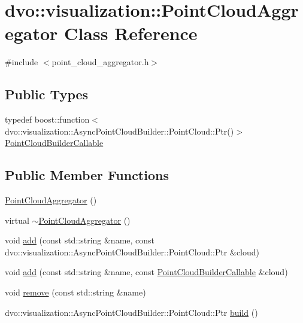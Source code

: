 \hypertarget{classdvo_1_1visualization_1_1_point_cloud_aggregator}{}\section{dvo\+:\+:visualization\+:\+:Point\+Cloud\+Aggregator Class Reference}
\label{classdvo_1_1visualization_1_1_point_cloud_aggregator}


{\ttfamily \#include $<$point\+\_\+cloud\+\_\+aggregator.\+h$>$}

\subsection*{Public Types}
\begin{DoxyCompactItemize}
\item 
typedef boost\+::function$<$ dvo\+::visualization\+::\+Async\+Point\+Cloud\+Builder\+::\+Point\+Cloud\+::\+Ptr()$>$ \mbox{\hyperlink{classdvo_1_1visualization_1_1_point_cloud_aggregator_ae1b18727d90a4dd9bdca6305a1910919}{Point\+Cloud\+Builder\+Callable}}
\end{DoxyCompactItemize}
\subsection*{Public Member Functions}
\begin{DoxyCompactItemize}
\item 
\mbox{\hyperlink{classdvo_1_1visualization_1_1_point_cloud_aggregator_a26c848965856175b7ed7e0e9d59a30f7}{Point\+Cloud\+Aggregator}} ()
\item 
virtual \mbox{\hyperlink{classdvo_1_1visualization_1_1_point_cloud_aggregator_a0180b6085e6959bbf5552b0893455836}{$\sim$\+Point\+Cloud\+Aggregator}} ()
\item 
void \mbox{\hyperlink{classdvo_1_1visualization_1_1_point_cloud_aggregator_ae4459e1bdd53f8e814975a1a549eac76}{add}} (const std\+::string \&name, const dvo\+::visualization\+::\+Async\+Point\+Cloud\+Builder\+::\+Point\+Cloud\+::\+Ptr \&cloud)
\item 
void \mbox{\hyperlink{classdvo_1_1visualization_1_1_point_cloud_aggregator_ab211ac0660dbb93373a4708ad370f697}{add}} (const std\+::string \&name, const \mbox{\hyperlink{classdvo_1_1visualization_1_1_point_cloud_aggregator_ae1b18727d90a4dd9bdca6305a1910919}{Point\+Cloud\+Builder\+Callable}} \&cloud)
\item 
void \mbox{\hyperlink{classdvo_1_1visualization_1_1_point_cloud_aggregator_a32aec6fbd2cf1978e9ca57e5884ebbed}{remove}} (const std\+::string \&name)
\item 
dvo\+::visualization\+::\+Async\+Point\+Cloud\+Builder\+::\+Point\+Cloud\+::\+Ptr \mbox{\hyperlink{classdvo_1_1visualization_1_1_point_cloud_aggregator_a2d7faa969378d465e574fd41af8ffda0}{build}} ()
\end{DoxyCompactItemize}


